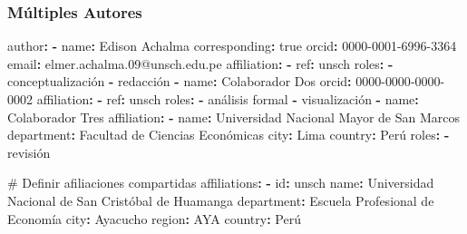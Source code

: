 \documentclass[
  doc,
  floatsintext,
  longtable,
  a4paper,
  nolmodern,
  notxfonts,
  notimes,
  12pt,
  colorlinks=true,linkcolor=blue,citecolor=blue,urlcolor=blue]{apa7}
\newenvironment{Shaded}{\begin{snugshade}}{\end{snugshade}}
\newcommand{\AttributeTok}[1]{\textcolor[rgb]{0.40,0.45,0.13}{#1}}
\newcommand{\CharTok}[1]{\textcolor[rgb]{0.13,0.47,0.30}{#1}}
\newcommand{\CommentTok}[1]{\textcolor[rgb]{0.37,0.37,0.37}{#1}}
\newcommand{\FunctionTok}[1]{\textcolor[rgb]{0.28,0.35,0.67}{#1}}
\newcommand{\KeywordTok}[1]{\textcolor[rgb]{0.00,0.23,0.31}{\textbf{#1}}}
\begin{document}
\subsubsection{Múltiples Autores}\label{muxfaltiples-autores}

\begin{Shaded}
\begin{Highlighting}[]
\FunctionTok{author}\KeywordTok{:}
\AttributeTok{  }\KeywordTok{{-}}\AttributeTok{ }\FunctionTok{name}\KeywordTok{:}\AttributeTok{ Edison Achalma}
\AttributeTok{    }\FunctionTok{corresponding}\KeywordTok{:}\AttributeTok{ }\CharTok{true}
\AttributeTok{    }\FunctionTok{orcid}\KeywordTok{:}\AttributeTok{ 0000{-}0001{-}6996{-}3364}
\AttributeTok{    }\FunctionTok{email}\KeywordTok{:}\AttributeTok{ elmer.achalma.09@unsch.edu.pe}
\AttributeTok{    }\FunctionTok{affiliation}\KeywordTok{:}
\AttributeTok{      }\KeywordTok{{-}}\AttributeTok{ }\FunctionTok{ref}\KeywordTok{:}\AttributeTok{ unsch}
\AttributeTok{    }\FunctionTok{roles}\KeywordTok{:}
\AttributeTok{      }\KeywordTok{{-}}\AttributeTok{ conceptualización}
\AttributeTok{      }\KeywordTok{{-}}\AttributeTok{ redacción}
\AttributeTok{      }
\AttributeTok{  }\KeywordTok{{-}}\AttributeTok{ }\FunctionTok{name}\KeywordTok{:}\AttributeTok{ Colaborador Dos}
\AttributeTok{    }\FunctionTok{orcid}\KeywordTok{:}\AttributeTok{ 0000{-}0000{-}0000{-}0002}
\AttributeTok{    }\FunctionTok{affiliation}\KeywordTok{:}
\AttributeTok{      }\KeywordTok{{-}}\AttributeTok{ }\FunctionTok{ref}\KeywordTok{:}\AttributeTok{ unsch}
\AttributeTok{    }\FunctionTok{roles}\KeywordTok{:}
\AttributeTok{      }\KeywordTok{{-}}\AttributeTok{ análisis formal}
\AttributeTok{      }\KeywordTok{{-}}\AttributeTok{ visualización}
\AttributeTok{      }
\AttributeTok{  }\KeywordTok{{-}}\AttributeTok{ }\FunctionTok{name}\KeywordTok{:}\AttributeTok{ Colaborador Tres}
\AttributeTok{    }\FunctionTok{affiliation}\KeywordTok{:}
\AttributeTok{      }\KeywordTok{{-}}\AttributeTok{ }\FunctionTok{name}\KeywordTok{:}\AttributeTok{ Universidad Nacional Mayor de San Marcos}
\AttributeTok{        }\FunctionTok{department}\KeywordTok{:}\AttributeTok{ Facultad de Ciencias Económicas}
\AttributeTok{        }\FunctionTok{city}\KeywordTok{:}\AttributeTok{ Lima}
\AttributeTok{        }\FunctionTok{country}\KeywordTok{:}\AttributeTok{ Perú}
\AttributeTok{    }\FunctionTok{roles}\KeywordTok{:}
\AttributeTok{      }\KeywordTok{{-}}\AttributeTok{ revisión}

\CommentTok{\# Definir afiliaciones compartidas}
\FunctionTok{affiliations}\KeywordTok{:}
\AttributeTok{  }\KeywordTok{{-}}\AttributeTok{ }\FunctionTok{id}\KeywordTok{:}\AttributeTok{ unsch}
\AttributeTok{    }\FunctionTok{name}\KeywordTok{:}\AttributeTok{ Universidad Nacional de San Cristóbal de Huamanga}
\AttributeTok{    }\FunctionTok{department}\KeywordTok{:}\AttributeTok{ Escuela Profesional de Economía}
\AttributeTok{    }\FunctionTok{city}\KeywordTok{:}\AttributeTok{ Ayacucho}
\AttributeTok{    }\FunctionTok{region}\KeywordTok{:}\AttributeTok{ AYA}
\AttributeTok{    }\FunctionTok{country}\KeywordTok{:}\AttributeTok{ Perú}
\end{Highlighting}
\end{Shaded}
\end{document}
